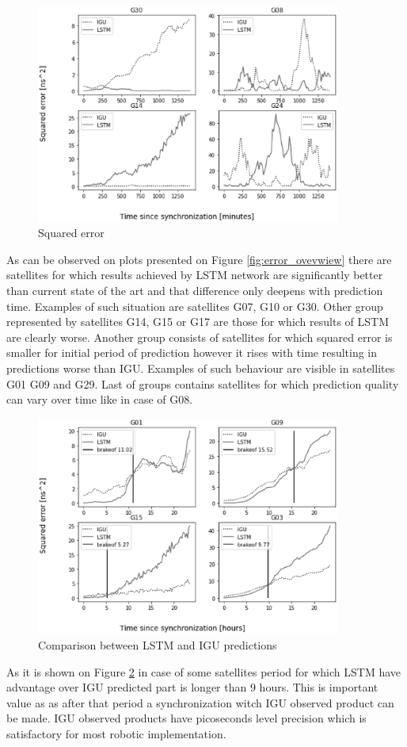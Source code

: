 \documentclass{kybernetika}
\begin{document}
\begin{figure}[ht] 
\centering
	\includegraphics[width=10cm]{figures/error_overwiev}
\caption{Squared error}
\label{fig:error_overview}
\end{figure}
As can be observed on plots presented on Figure \ref{fig:error_ovevwiew} there are satellites
for which results achieved by LSTM network are significantly better than current state of the
art and that difference only deepens with prediction time. Examples of such situation are
satellites G07, G10 or G30. Other group represented by satellites G14, G15 or G17 are those 
for which results of LSTM are clearly worse. Another group consists of satellites for which 
squared error is smaller for initial period of prediction however it rises with time resulting
in predictions worse than IGU. Examples of such behaviour are visible in satellites G01
G09 and G29. Last of groups contains satellites for which prediction quality can vary over
time like in case of G08.
\begin{figure}[ht] 
\centering
	\includegraphics[width=10cm]{figures/brakeoff_compare}
\caption{Comparison between LSTM and IGU predictions}
\label{fig:cutoff}
\end{figure}
As it is shown on Figure \ref{fig:cutoff} in case of some satellites period for which LSTM
have advantage over IGU predicted part is longer than 9 hours. This is important value as 
as after that period a synchronization witch IGU observed product can be made.
IGU observed products have picoseconds level precision which is satisfactory for most 
robotic implementation.
\end{document}
